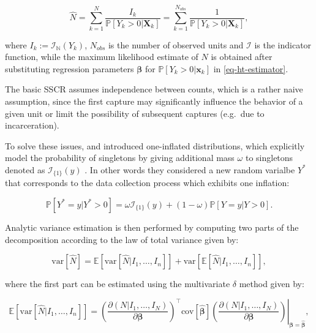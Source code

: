 \documentclass[
]{jss}
\newcommand{\1}{\mathcal{I}} \newcommand{\bZero}{\boldsymbol{0}}
\begin{document}
\begin{equation}
\hat{N}=
\sum_{k=1}^{N}\frac{I_{k}}{\mathbb{P}[Y_{k}>0|\boldsymbol{X}_{k}]}=
\sum_{k=1}^{N_{obs}}\frac{1}{\mathbb{P}[Y_{k}>0|\boldsymbol{X}_{k}]},
\label{eq-ht-estimator}
\end{equation}

where \(I_{k}:=\mathcal{I}_{\mathbb{N}}(Y_{k})\), \(N_{obs}\) is the
number of observed units and \(\mathcal{I}\) is the indicator function,
while the maximum likelihood estimate of \(N\) is obtained after
substituting regression parameters \(\boldsymbol{\beta}\) for
\(\mathbb{P}[Y_{k}>0|\boldsymbol{x}_{k}]\) in \eqref{eq-ht-estimator}.

The basic SSCR assumes independence between counts, which is a rather
naive assumption, since the first capture may significantly influence
the behavior of a given unit or limit the possibility of subsequent
captures (e.g.~due to incarceration).

To solve these issues, \citet{godwin2017estimation} and
\citet{ztoi-oizt-poisson} introduced one-inflated distributions, which
explicitly model the probability of singletons by giving additional mass
\(\omega\) to singletons denoted as \(\mathcal{I}_{\{1\}}(y)\)
\citep[cf.][]{bohning2024one}. In other words they considered a new
random varialbe \(Y^{\ast}\) that corresponds to the data collection
process which exhibits one inflation:

\begin{equation*}
  \mathbb{P}\left[Y^{\ast}=y|Y^{\ast}>0\right] =
  \omega\mathcal{I}_{\{1\}}(y)+(1-\omega)\mathbb{P}[Y=y|Y>0].
\end{equation*}

Analytic variance estimation is then performed by computing two parts of
the decomposition according to the law of total variance given by:

\begin{equation}\label{eq-law_of_total_variance_decomposition}
  \text{var}[\hat{N}] = \mathbb{E}\left[\text{var}
  \left[\hat{N}|I_{1},\dots,I_{n}\right]\right] + 
  \text{var}\left[\mathbb{E}[\hat{N}|I_{1},\dots,I_{n}]\right],
\end{equation}

where the first part can be estimated using the multivariate \(\delta\)
method given by:

\begin{equation*}
  \mathbb{E}\left[\text{var} \left[\hat{N}|I_{1},\dots,I_{n}\right]\right] =
  \left.\left(\frac{\partial(N|I_1,\dots,I_N)}{\partial\boldsymbol{\beta}}\right)^\top
  \text{cov}\left[\hat{\boldsymbol{\beta}}\right]
  \left(\frac{\partial(N|I_1,\dots,I_N)}{\partial\boldsymbol{\beta}}\right)
  \right|_{\boldsymbol{\beta}=\hat{\boldsymbol{\beta}}},
\end{equation*}
\end{document}
